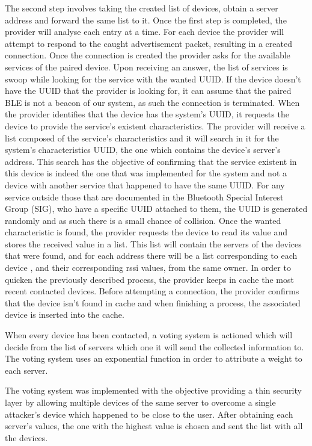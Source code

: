 The second step involves taking the created list of devices, obtain a server address and forward the same list to it. Once the first step is completed, the provider will analyse each entry at a time. For each device the provider will attempt to respond to the caught advertisement packet, resulting in a created connection.  Once the connection is created the provider asks for the available services of the paired device. Upon receiving an answer, the list of services is swoop while looking for the service with the wanted UUID. If the device doesn't have the UUID that the provider is looking for, it can assume that the paired \ac{BLE} is not a beacon of our system, as such the connection is terminated. When the provider identifies that the device has the system's UUID, it requests the device to provide the service's existent characteristics. The provider will receive a list composed of the service's characteristics and it will search in it for the system's characteristics UUID, the one which contains the device's server's address. This search has the objective of confirming that the service existent in this device is indeed the one that was implemented for the system and not a device with another service that happened to have the same UUID. For any service outside those that are documented in the Bluetooth Special Interest Group (SIG), who have a specific UUID attached to them, the UUID is generated randomly and as such there is a small chance of collision. Once the wanted characteristic is found, the provider requests the device to read its value and stores the received value in a list. This list will contain the servers of the devices that were found, and for each address there will be a list corresponding to each device , and their corresponding rssi values, from the same owner. In order to quicken the previously described process, the provider keeps in cache the most recent contacted devices. Before attempting a connection, the provider confirms that the device isn't found in cache and when finishing a process, the associated device is inserted into the cache.

When every device has been contacted, a voting system is actioned which will decide from the list of servers which one it will send the collected information to. The voting system uses an exponential function in order to attribute a weight to each server. %

The voting system was implemented with the objective providing a thin security layer by allowing multiple devices of the same server to overcome a single attacker's device which happened to be close to the user. After obtaining each server's values, the one with the highest value is chosen and sent the list with all the devices. 

